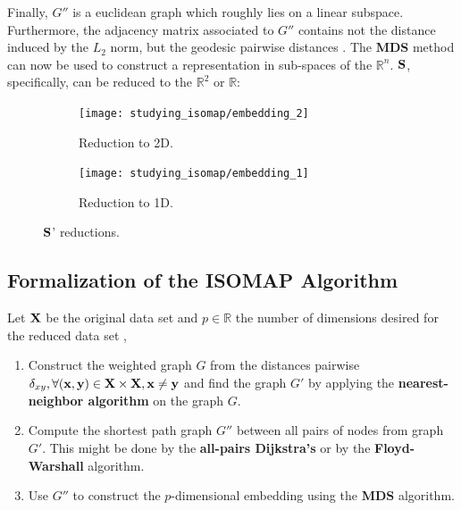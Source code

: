 Finally, $G''$ is a euclidean graph which roughly lies on a linear subspace. Furthermore, the adjacency matrix associated to $G''$ contains not the distance induced by the $L_2$ norm, but the geodesic pairwise distances \cite{gho2006}. The \textbf{MDS} method can now be used to construct a representation in sub-spaces of the $\mathbb{R}^n$. $\mathbf{S}$, specifically, can be reduced to the $\mathbb{R}^2$ or $\mathbb{R}$:

\begin{figure}[H]
    \begin{subfigure}{.5\linewidth}
		\centering
		\captionsetup{justification=centering}
		\texttt{[image: studying\_isomap/embedding\_2]}
		\caption{Reduction to 2D.}
		\label{fig:mani_s_reduced_1}
	\end{subfigure}%
	\begin{subfigure}{.5\linewidth}
		\centering
		\captionsetup{justification=centering}
		\texttt{[image: studying\_isomap/embedding\_1]}
		\caption{Reduction to 1D.}
		\label{fig:mani_s_reduced_2}
	\end{subfigure}
	\caption{$\mathbf{S}$' reductions.}
	\label{fig:mani_s_reduced}
\end{figure}

\newpage
\subsection{Formalization of the ISOMAP Algorithm}

Let $\mathbf{X}$ be the original data set and $p \in \mathbb{R}$ the number of dimensions desired for the reduced data set \cite{ten2000},

\begin{enumerate}
	\item Construct the weighted graph $G$ from the distances pairwise $\delta_{xy}, \forall (\mathbf{x}, \mathbf{y}) \in \mathbf{X} \times \mathbf{X}, \mathbf{x} \ne \mathbf{y}$ and find the graph $G'$ by applying the \textbf{nearest-neighbor algorithm} on the graph $G$.

	\item Compute the shortest path graph $G''$ between all pairs of nodes from graph $G'$. This might be done by the \textbf{all-pairs Dijkstra's} or by the \textbf{Floyd-Warshall} algorithm.

	\item Use $G''$ to construct the $p$-dimensional embedding using the \textbf{MDS} algorithm.
\end{enumerate}

